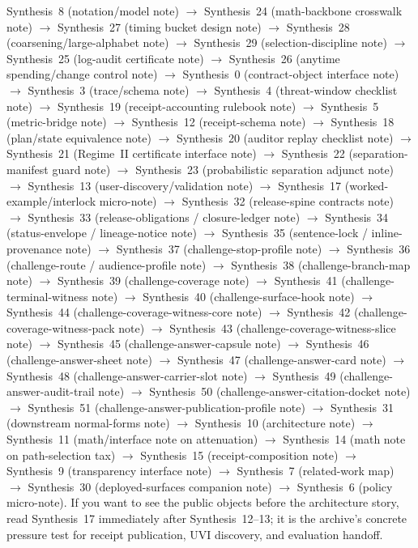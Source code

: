 \documentclass[11pt]{article}
\begin{document}
\begin{enumerate}[leftmargin=*]
  Synthesis~8 (notation/model note) $\rightarrow$ Synthesis~24 (math-backbone crosswalk note) $\rightarrow$ Synthesis~27 (timing bucket design note) $\rightarrow$ Synthesis~28 (coarsening/large-alphabet note) $\rightarrow$ Synthesis~29 (selection-discipline note) $\rightarrow$ Synthesis~25 (log-audit certificate note) $\rightarrow$ Synthesis~26 (anytime spending/change control note) $\rightarrow$ Synthesis~0 (contract-object interface note) $\rightarrow$ Synthesis~3 (trace/schema note) $\rightarrow$ Synthesis~4 (threat-window checklist note) $\rightarrow$ Synthesis~19 (receipt-accounting rulebook note) $\rightarrow$ Synthesis~5 (metric-bridge note) $\rightarrow$ Synthesis~12 (receipt-schema note) $\rightarrow$ Synthesis~18 (plan/state equivalence note) $\rightarrow$ Synthesis~20 (auditor replay checklist note) $\rightarrow$ Synthesis~21 (Regime~II certificate interface note) $\rightarrow$ Synthesis~22 (separation-manifest guard note) $\rightarrow$ Synthesis~23 (probabilistic separation adjunct note) $\rightarrow$ Synthesis~13 (user-discovery/validation note) $\rightarrow$ Synthesis~17 (worked-example/interlock micro-note) $\rightarrow$ Synthesis~32 (release-spine contracts note) $\rightarrow$ Synthesis~33 (release-obligations / closure-ledger note) $\rightarrow$ Synthesis~34 (status-envelope / lineage-notice note) $\rightarrow$ Synthesis~35 (sentence-lock / inline-provenance note) $\rightarrow$ Synthesis~37 (challenge-stop-profile note) $\rightarrow$ Synthesis~36 (challenge-route / audience-profile note) $\rightarrow$ Synthesis~38 (challenge-branch-map note) $\rightarrow$ Synthesis~39 (challenge-coverage note) $\rightarrow$ Synthesis~41 (challenge-terminal-witness note) $\rightarrow$ Synthesis~40 (challenge-surface-hook note) $\rightarrow$ Synthesis~44 (challenge-coverage-witness-core note) $\rightarrow$ Synthesis~42 (challenge-coverage-witness-pack note) $\rightarrow$ Synthesis~43 (challenge-coverage-witness-slice note) $\rightarrow$ Synthesis~45 (challenge-answer-capsule note) $\rightarrow$ Synthesis~46 (challenge-answer-sheet note) $\rightarrow$ Synthesis~47 (challenge-answer-card note) $\rightarrow$ Synthesis~48 (challenge-answer-carrier-slot note) $\rightarrow$ Synthesis~49 (challenge-answer-audit-trail note) $\rightarrow$ Synthesis~50 (challenge-answer-citation-docket note) $\rightarrow$ Synthesis~51 (challenge-answer-publication-profile note) $\rightarrow$ Synthesis~31 (downstream normal-forms note) $\rightarrow$ Synthesis~10 (architecture note) $\rightarrow$ Synthesis~11 (math/interface note on attenuation) $\rightarrow$ Synthesis~14 (math note on path-selection tax) $\rightarrow$ Synthesis~15 (receipt-composition note) $\rightarrow$ Synthesis~9 (transparency interface note) $\rightarrow$ Synthesis~7 (related-work map) $\rightarrow$ Synthesis~30 (deployed-surfaces companion note) $\rightarrow$ Synthesis~6 (policy micro-note).
If you want to see the public objects before the architecture story, read Synthesis~17 immediately after Synthesis~12--13; it is the archive's concrete pressure test for receipt publication, UVI discovery, and evaluation handoff.
\end{enumerate}
\end{document}

